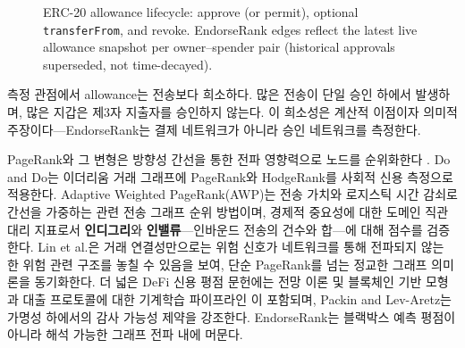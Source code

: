 \begin{figure}[htbp]
\centering
{}
\caption{ERC-20 allowance lifecycle: approve (or permit), optional \texttt{transferFrom}, and revoke. EndorseRank edges reflect the latest live allowance snapshot per owner--spender pair (historical approvals superseded, not time-decayed).}
\label{fig:allowance-sequence}
\end{figure}

측정 관점에서 allowance는 전송보다 희소하다. 많은 전송이 단일 승인 하에서 발생하며, 많은 지갑은 제3자 지출자를 승인하지 않는다. 이 희소성은 계산적 이점이자 의미적 주장이다---EndorseRank는 결제 네트워크가 아니라 승인 네트워크를 측정한다.


PageRank와 그 변형은 방향성 간선을 통한 전파 영향력으로 노드를 순위화한다 . Do and Do는 이더리움 거래 그래프에 PageRank와 HodgeRank를 사회적 신용 측정으로 적용한다. Adaptive Weighted PageRank(AWP)는 전송 가치와 로지스틱 시간 감쇠로 간선을 가중하는 관련 전송 그래프 순위 방법이며, 경제적 중요성에 대한 도메인 직관 대리 지표로서 \textbf{인디그리}와 \textbf{인밸류}---인바운드 전송의 건수와 합---에 대해 점수를 검증한다. Lin et al.은 거래 연결성만으로는 위험 신호가 네트워크를 통해 전파되지 않는 한 위험 관련 구조를 놓칠 수 있음을 보여, 단순 PageRank를 넘는 정교한 그래프 의미론을 동기화한다. 더 넓은 DeFi 신용 평점 문헌에는 전망 이론 및 블록체인 기반 모형 과 대출 프로토콜에 대한 기계학습 파이프라인 이 포함되며, Packin and Lev-Aretz는 가명성 하에서의 감사 가능성 제약을 강조한다. EndorseRank는 블랙박스 예측 평점이 아니라 해석 가능한 그래프 전파 내에 머문다.


